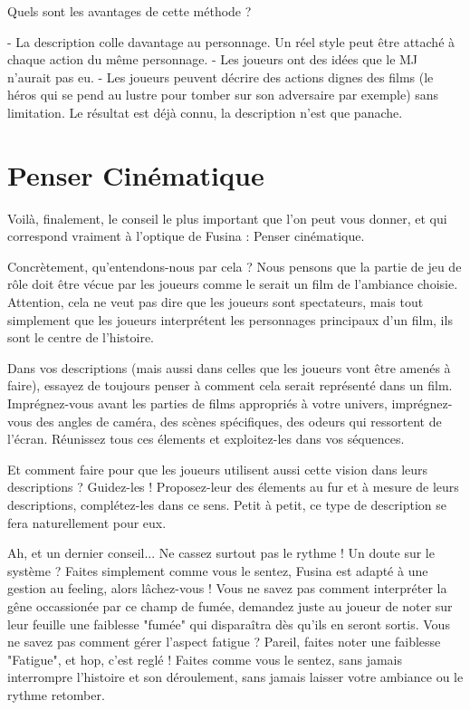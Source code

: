Quels sont les avantages de cette méthode ?


- La description colle davantage au personnage. Un réel style peut être attaché à chaque action du même personnage.
- Les joueurs ont des idées que le MJ n'aurait pas eu.
- Les joueurs peuvent décrire des actions dignes des films (le héros qui se pend au lustre pour tomber sur son adversaire par exemple) sans limitation. Le résultat est déjà connu, la description n'est que panache.


\section{Penser Cinématique}

Voilà, finalement, le conseil le plus important que l'on peut vous donner, et qui correspond vraiment à l'optique de Fusina : Penser cinématique.

Concrètement, qu'entendons-nous par cela ? Nous pensons que la partie de jeu de rôle doit être vécue par les joueurs comme le serait un film de l'ambiance choisie. Attention, cela ne veut pas dire que les joueurs sont spectateurs, mais tout simplement que les joueurs interprétent les personnages principaux d'un film, ils sont le centre de l'histoire. 

Dans vos descriptions (mais aussi dans celles que les joueurs vont être amenés à faire), essayez de toujours penser à comment cela serait représenté dans un film. Imprégnez-vous avant les parties de films appropriés à votre univers, imprégnez-vous des angles de caméra, des scènes spécifiques, des odeurs qui ressortent de l'écran. Réunissez tous ces élements et exploitez-les dans vos séquences.

Et comment faire pour que les joueurs utilisent aussi cette vision dans leurs descriptions ? Guidez-les ! Proposez-leur des élements au fur et à mesure de leurs descriptions, complétez-les dans ce sens. Petit à petit, ce type de description se fera naturellement pour eux. 

Ah, et un dernier conseil... Ne cassez surtout pas le rythme ! Un doute sur le système ? Faites simplement comme vous le sentez, Fusina est adapté à une gestion au feeling, alors lâchez-vous ! Vous ne savez pas comment interpréter la gêne occassionée par ce champ de fumée, demandez juste au joueur de noter sur leur feuille une faiblesse "fumée" qui disparaîtra dès qu'ils en seront sortis. Vous ne savez pas comment gérer l'aspect fatigue ? Pareil, faites noter une faiblesse "Fatigue", et hop, c'est reglé ! Faites comme vous le sentez, sans jamais interrompre l'histoire et son déroulement, sans jamais laisser votre ambiance ou le rythme retomber.

